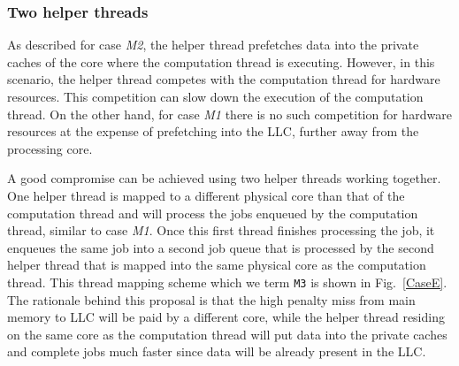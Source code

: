 \subsubsection{Two helper threads}

As described for case \emph{M2}, the helper thread prefetches data into the private caches of the core where the computation thread is executing. However, in this scenario, the helper thread competes with the computation thread for hardware resources. This competition can slow down the execution of the computation thread. On the other hand, for case \emph{M1} there is no such competition for hardware resources at the expense of prefetching into the LLC, further away from the processing core.

A good compromise can be achieved using two helper threads working together. One helper thread is mapped to a different physical core than that of the computation thread and will process the jobs enqueued by the computation thread, similar to case \emph{M1}. Once this first thread finishes processing the job, it enqueues the same job into a second job queue that is processed by the second helper thread that is mapped into the same physical core as the computation thread. This thread mapping scheme which we term \verb+M3+ is shown in Fig.~\ref{CaseE}. The rationale behind this proposal is that the high penalty miss from main memory to LLC will be paid by a different core, while the helper thread residing on the same core as the computation thread will put data into the private caches and complete jobs much faster since data will be already present in the LLC.
